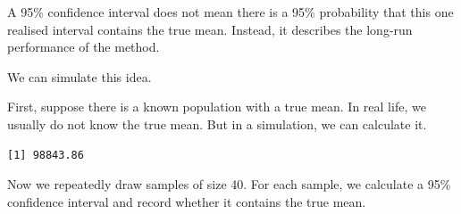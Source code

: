 \documentclass[
  letterpaper,
  DIV=11,
  numbers=noendperiod]{scrreprt}
\newenvironment{Shaded}{\begin{snugshade}}{\end{snugshade}}
\newcommand{\FunctionTok}[1]{\textcolor[rgb]{0.28,0.35,0.67}{#1}}
\newcommand{\NormalTok}[1]{\textcolor[rgb]{0.00,0.23,0.31}{#1}}
\newcommand{\OtherTok}[1]{\textcolor[rgb]{0.00,0.23,0.31}{#1}}
\newcommand{\SpecialCharTok}[1]{\textcolor[rgb]{0.37,0.37,0.37}{#1}}
\begin{document}
A 95\% confidence interval does not mean there is a 95\% probability
that this one realised interval contains the true mean. Instead, it
describes the long-run performance of the method.

We can simulate this idea.

First, suppose there is a known population with a true mean. In real
life, we usually do not know the true mean. But in a simulation, we can
calculate it.

\begin{Shaded}
\end{Shaded}

\begin{verbatim}
[1] 98843.86
\end{verbatim}

Now we repeatedly draw samples of size 40. For each sample, we calculate
a 95\% confidence interval and record whether it contains the true mean.
\end{document}
